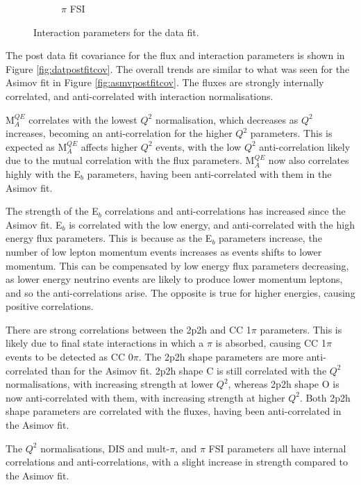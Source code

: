 \begin{figure}
\begin{subfigure}{0.49\textwidth}
  \caption{$\pi$ FSI}
  \label{fig:}
\end{subfigure}
\caption{Interaction parameters for the data fit.}
\label{fig:datxsec}
\end{figure}

The post data fit covariance for the flux and interaction parameters is shown in Figure \ref{fig:datpostfitcov}. The overall trends are similar to what was seen for the Asimov fit in Figure \ref{fig:asmvpostfitcov}. The fluxes are strongly internally correlated, and anti-correlated with interaction normalisations. 

M$^{QE}_A$ correlates with the lowest $Q^2$ normalisation, which decreases as $Q^2$ increases, becoming an anti-correlation for the higher $Q^2$ parameters. This is expected as M$^{QE}_A$ affects higher $Q^2$ events, with the low $Q^2$ anti-correlation likely due to the mutual correlation with the flux parameters. M$^{QE}_A$ now also correlates highly with the E$_b$ parameters, having been anti-correlated with them in the Asimov fit.

The strength of the E$_b$ correlations and anti-correlations has increased since the Asimov fit. E$_b$ is correlated with the low energy, and anti-correlated with the high energy flux parameters. This is because as the E$_b$ parameters increase, the number of low lepton momentum events increases as events shifts to lower momentum. This can be compensated by low energy flux parameters decreasing, as lower energy neutrino events are likely to produce lower momentum leptons, and so the anti-correlations arise. The opposite is true for higher energies, causing positive correlations.

There are strong correlations between the 2p2h and CC 1$\pi$ parameters. This is likely due to final state interactions in which a $\pi$ is absorbed, causing CC 1$\pi$ events to be detected as CC 0$\pi$. The 2p2h shape parameters are more anti-correlated than for the Asimov fit. 2p2h shape C is still correlated with the $Q^2$ normalisations, with increasing strength at lower $Q^2$, whereas 2p2h shape O is now anti-correlated with them, with increasing strength at higher $Q^2$. Both 2p2h shape parameters are correlated with the fluxes, having been anti-correlated in the Asimov fit.

The $Q^2$ normalisations, DIS and mult-$\pi$, and $\pi$ FSI parameters all have internal correlations and anti-correlations, with a slight increase in strength compared to the Asimov fit. 

